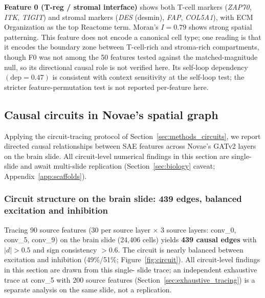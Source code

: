 \documentclass[11pt]{article}
\begin{document}
\textbf{Feature 0 (T-reg / stromal interface)} shows both T-cell
markers (\emph{ZAP70}, \emph{ITK}, \emph{TIGIT}) and stromal markers
(\emph{DES} (desmin), \emph{FAP}, \emph{COL5A1}), with ECM
Organization as the top Reactome term. Moran's $I = 0.79$ shows
strong spatial patterning. This feature does not encode a canonical
cell type; one reading is that it encodes the boundary zone between
T-cell-rich and stroma-rich compartments, though F0 was not among
the 50 features tested against the matched-magnitude null, so its
directional causal role is not verified here. Its self-loop
dependency $(\text{dep} = 0.47)$ is consistent with context
sensitivity at the self-loop test; the stricter feature-permutation
test is not reported per-feature here.

\subsection{Causal circuits in Novae's spatial graph}

Applying the circuit-tracing protocol of
Section~\ref{sec:methods_circuits}, we report directed causal
relationships between SAE features across Novae's GATv2 layers on
the brain slide. All circuit-level numerical findings in this
section are single-slide and await multi-slide replication
(Section~\ref{sec:biology} caveat; Appendix~\ref{app:scaffolds}).

\subsubsection{Circuit structure on the brain slide: 439 edges, balanced excitation and inhibition}

Tracing 90 source features (30 per source layer $\times$ 3 source
layers: conv\_0, conv\_5, conv\_9) on the brain slide
(24{,}406 cells) yields \textbf{439 causal edges} with $|d| > 0.5$
and sign consistency $> 0.6$. The circuit is nearly balanced between
excitation and inhibition (49\%/51\%; Figure~\ref{fig:circuit}). All
circuit-level findings in this section are drawn from this single-
slide trace; an independent exhaustive trace at conv\_5 with 200
source features (Section~\ref{sec:exhaustive_tracing}) is a separate
analysis on the same slide, not a replication.
\end{document}
